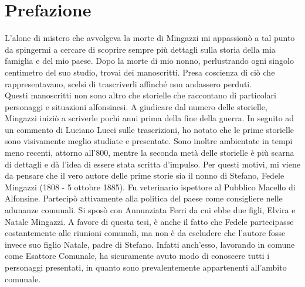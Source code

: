\thispagestyle{empty}
\chapter*{Prefazione}
L'alone di mistero che avvolgeva la morte di Mingazzi mi appassionò a tal punto da spingermi a cercare di scoprire sempre più dettagli sulla storia della mia famiglia e del mio paese. Dopo la morte di mio nonno, perlustrando ogni singolo centimetro del suo studio, trovai dei manoscritti. Presa coscienza di ciò che rappresentavano, scelsi di trascriverli affinché non andassero perduti.\\
\indent Questi manoscritti non sono altro che storielle che raccontano di particolari personaggi e situazioni alfonsinesi. A giudicare dal numero delle storielle, Mingazzi iniziò a scriverle pochi anni prima della fine della guerra. 
In seguito ad un commento di Luciano Lucci sulle trascrizioni, ho notato che le prime storielle sono visivamente meglio studiate e presentate. Sono inoltre ambientate in tempi meno recenti, attorno all'800, mentre la seconda metà delle storielle è più scarna di dettagli e dà l'idea di essere stata scritta d'impulso. Per questi motivi, mi viene da pensare che il vero autore delle prime storie sia il nonno di Stefano, Fedele Mingazzi (1808 - 5 ottobre 1885). Fu veterinario ispettore al Pubblico Macello di Alfonsine. Partecipò attivamente alla politica del paese come consigliere nelle adunanze comunali. Si sposò con Annunziata Ferri da cui ebbe due figli, Elvira e Natale Mingazzi. A favore di questa tesi, è anche il fatto che Fedele partecipasse costantemente alle riunioni comunali, ma non è da escludere che l'autore fosse invece suo figlio Natale, padre di Stefano. Infatti anch'esso, lavorando in comune come Esattore Comunale, ha sicuramente avuto modo di conoscere tutti i personaggi presentati, in quanto sono prevalentemente appartenenti all'ambito comunale.\\

\begin{figure}[hbt]%
	\vspace{-1cm}
    \centering
	\vspace{-0.2cm}
\end{figure}


